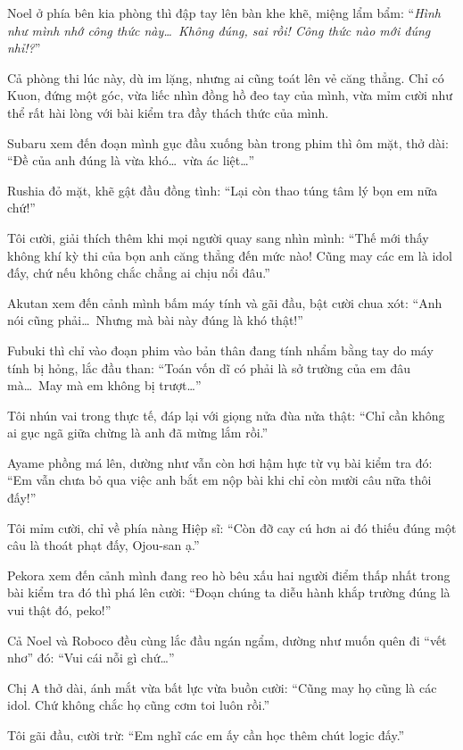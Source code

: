 \documentclass[../main.tex]{subfiles}
\begin{document}
Noel ở phía bên kia phòng thì đập tay lên bàn khe khẽ, miệng lẩm bẩm: ``\textit{Hình như mình nhớ công thức này\dots\ Không đúng, sai rồi! Công thức nào mới đúng nhỉ!?}''

Cả phòng thi lúc này, dù im lặng, nhưng ai cũng toát lên vẻ căng thẳng. Chỉ có Kuon, đứng một góc, vừa liếc nhìn đồng hồ đeo tay của mình, vừa mỉm cười như thể rất hài lòng với bài kiểm tra đầy thách thức của mình.

\il

Subaru xem đến đoạn mình gục đầu xuống bàn trong phim thì ôm mặt, thở dài: ``Đề của anh đúng là vừa khó\dots\ vừa ác liệt\dots''

Rushia đỏ mặt, khẽ gật đầu đồng tình: ``Lại còn thao túng tâm lý bọn em nữa chứ!''

Tôi cười, giải thích thêm khi mọi người quay sang nhìn mình: ``Thế mới thấy không khí kỳ thi của bọn anh căng thẳng đến mức nào! Cũng may các em là idol đấy, chứ nếu không chắc chẳng ai chịu nổi đâu.''

Akutan xem đến cảnh mình bấm máy tính và gãi đầu, bật cười chua xót: ``Anh nói cũng phải\dots\ Nhưng mà bài này đúng là khó thật!''

Fubuki thì chỉ vào đoạn phim vào bản thân đang tính nhẩm bằng tay do máy tính bị hỏng, lắc đầu than: ``Toán vốn dĩ có phải là sở trường của em đâu mà\dots\ May mà em không bị trượt\dots''

Tôi nhún vai trong thực tế, đáp lại với giọng nửa đùa nửa thật: ``Chỉ cần không ai gục ngã giữa chừng là anh đã mừng lắm rồi.''

Ayame phồng má lên, dường như vẫn còn hơi hậm hực từ vụ bài kiểm tra đó: ``Em vẫn chưa bỏ qua việc anh bắt em nộp bài khi chỉ còn mười câu nữa thôi đấy!''

Tôi mỉm cười, chỉ về phía nàng Hiệp sĩ: ``Còn đỡ cay cú hơn ai đó thiếu đúng một câu là thoát phạt đấy, Ojou-san ạ.''

Pekora xem đến cảnh mình đang reo hò bêu xấu hai người điểm thấp nhất trong bài kiểm tra đó thì phá lên cười: ``Đoạn chúng ta diễu hành khắp trường đúng là vui thật đó, peko!''

Cả Noel và Roboco đều cùng lắc đầu ngán ngẩm, dường như muốn quên đi ``vết nhơ'' đó: ``Vui cái nỗi gì chứ\dots''

Chị A thở dài, ánh mắt vừa bất lực vừa buồn cười: ``Cũng may họ cũng là các idol. Chứ không chắc họ cũng cơm toi luôn rồi.''

Tôi gãi đầu, cười trừ: ``Em nghĩ các em ấy cần học thêm chút logic đấy.''
\end{document}
